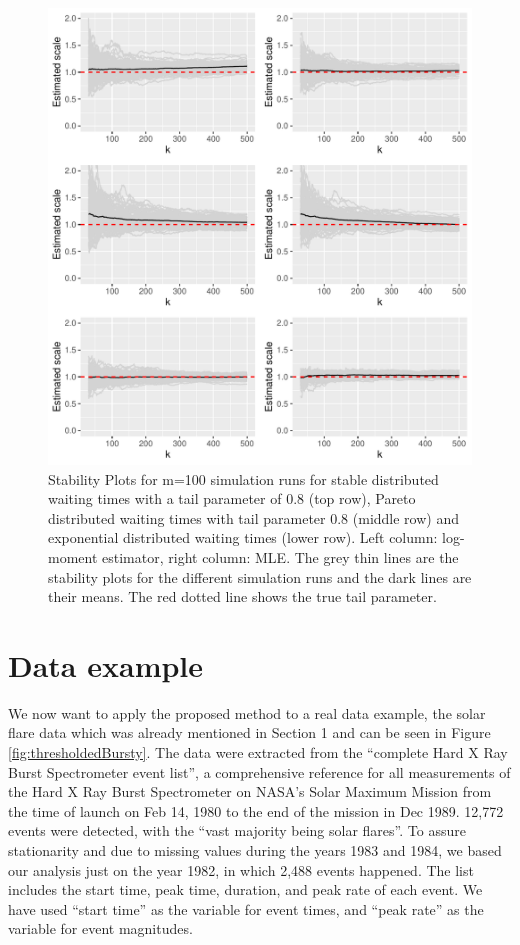 \documentclass[]{elsarticle} %
\begin{document}
\begin{figure}

{\centering \includegraphics[width=0.9\linewidth]{article_springer_files/figure-latex/ScaleSimuplots-1} 

}

\caption{\label{Fig:ScaleSimu} Stability Plots for m=100 simulation runs for stable distributed waiting times with a tail parameter of 0.8 (top row), Pareto distributed waiting times with tail parameter 0.8 (middle row) and exponential distributed waiting times (lower row). Left column: log-moment estimator, right column: MLE. The grey thin lines are the stability plots for the different simulation runs and the dark lines are their means. The red dotted line shows the true tail parameter.}\label{fig:ScaleSimuplots}
\end{figure}

\hypertarget{data-example}{%
\section{Data example}\label{data-example}}

We now want to apply the proposed method to a real data example, the
solar flare data which was already mentioned in Section 1 and can be
seen in Figure \ref{fig:thresholdedBursty}. The data were extracted from
the ``complete Hard X Ray Burst Spectrometer event list'', a
comprehensive reference for all measurements of the Hard X Ray Burst
Spectrometer on NASA's Solar Maximum Mission from the time of launch on
Feb 14, 1980 to the end of the mission in Dec 1989. 12,772 events were
detected, with the ``vast majority being solar flares''. To assure
stationarity and due to missing values during the years 1983 and 1984,
we based our analysis just on the year 1982, in which 2,488 events
happened. The list includes the start time, peak time, duration, and
peak rate of each event. We have used ``start time'' as the variable for
event times, and ``peak rate'' as the variable for event magnitudes.
\end{document}
